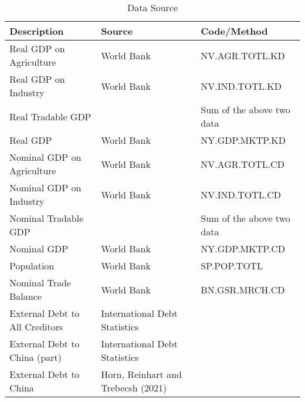 \begin{table}[t]
\centering
\begin{tabular}{@{}lll@{}}
Description                      & Source                             & Code/Method               \\ \midrule
Real GDP on Agriculture          & World Bank                         & NV.AGR.TOTL.KD            \\
Real GDP on Industry             & World Bank                         & NV.IND.TOTL.KD            \\
Real Tradable GDP                &                                    & Sum of the above two data \\
Real GDP                         & World Bank                         & NY.GDP.MKTP.KD            \\
Nominal GDP on Agriculture       & World Bank                         & NV.AGR.TOTL.CD            \\
Nominal GDP on Industry          & World Bank                         & NV.IND.TOTL.CD            \\
Nominal Tradable GDP             &                                    & Sum of the above two data \\
Nominal GDP                      & World Bank                         & NY.GDP.MKTP.CD            \\
Population                       & World Bank                         & SP.POP.TOTL               \\
Nominal Trade Balance            & World Bank                         & BN.GSR.MRCH.CD            \\
External Debt to All Creditors & International Debt Statistics      &                           \\
External Debt to China (part)  & International Debt Statistics      &                           \\
External Debt to China         & Horn, Reinhart and Trebecsh (2021) & \\\bottomrule
\end{tabular}
\caption{Data Source}
\label{tab: data-source}
\end{table}